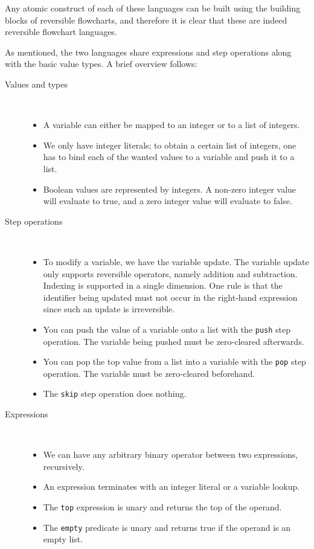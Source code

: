 Any atomic construct of each of these languages can be built using the building blocks of reversible flowcharts, and therefore it is clear that these are indeed reversible flowchart languages.

As mentioned, the two languages share expressions and step operations along with the basic value types. A brief overview follows:
\begin{description}
  \item[Values and types]~\
  \begin{itemize}
    \item A variable can either be mapped to an integer or to a list of integers.
    \item We only have integer literals; to obtain a certain list of integers, one has to bind each of the wanted values to a variable and push it to a list.
    \item Boolean values are represented by integers. A non-zero integer value will evaluate to true, and a zero integer value will evaluate to false.
  \end{itemize}
  \item [Step operations]~\
  \begin{itemize}
    \item To modify a variable, we have the variable update. The variable update only supports reversible operators, namely addition and subtraction. Indexing is supported in a single dimension. One rule is that the identifier being updated must not occur in the right-hand expression since such an update is irreversible.
    \item You can push the value of a variable onto a list with the \texttt{push} step operation. The variable being pushed must be zero-cleared afterwards.
    \item You can pop the top value from a list into a variable with the \texttt{pop} step operation. The variable must be zero-cleared beforehand.
    \item The \texttt{skip} step operation does nothing.
  \end{itemize}
  \item [Expressions]~\
  \begin{itemize}
    \item We can have any arbitrary binary operator between two expressions, recursively.
    \item An expression terminates with an integer literal or a variable lookup.
    \item The \texttt{top} expression is unary and returns the top of the operand.
    \item The \texttt{empty} predicate is unary and returns true if the operand is an empty list.
  \end{itemize}
\end{description}
